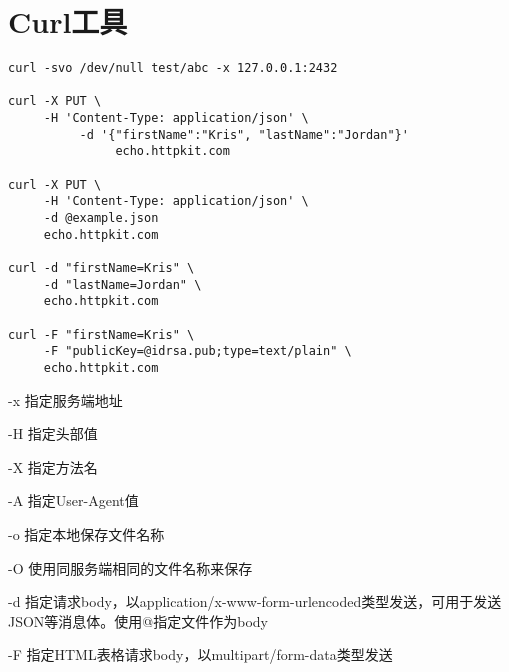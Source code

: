 \section{Curl工具}
 \begin{verbatim}
curl -svo /dev/null test/abc -x 127.0.0.1:2432

curl -X PUT \
     -H 'Content-Type: application/json' \
          -d '{"firstName":"Kris", "lastName":"Jordan"}'
               echo.httpkit.com

curl -X PUT \
     -H 'Content-Type: application/json' \
     -d @example.json
     echo.httpkit.com

curl -d "firstName=Kris" \
     -d "lastName=Jordan" \
     echo.httpkit.com

curl -F "firstName=Kris" \
     -F "publicKey=@idrsa.pub;type=text/plain" \
     echo.httpkit.com

 \end{verbatim}


-x 指定服务端地址

-H 指定头部值

-X 指定方法名

-A 指定User-Agent值

-o 指定本地保存文件名称

-O 使用同服务端相同的文件名称来保存

-d 指定请求body，以application/x-www-form-urlencoded类型发送，可用于发送JSON等消息体。使用@指定文件作为body

-F 指定HTML表格请求body，以multipart/form-data类型发送




